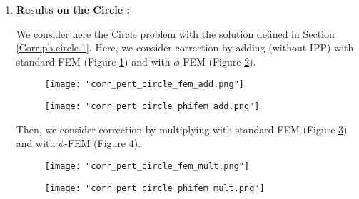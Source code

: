 \begin{enumerate}[label=\textbullet]
	\item \textbf{Results on the Circle :}
	
	We consider here the Circle problem with the solution defined in Section \ref{Corr.pb.circle.1}. Here, we consider correction by adding (without IPP) with standard FEM (Figure \ref{corr_pert_circle_fem_add}) and with $\phi$-FEM (Figure \ref{corr_pert_circle_phifem_add}).
	
	\begin{minipage}{0.48\linewidth}
		\begin{figure}[H]
			\centering
			\texttt{[image: "corr\_pert\_circle\_fem\_add.png"]}
			\label{corr_pert_circle_fem_add}
		\end{figure} 
	\end{minipage}
	\begin{minipage}{0.48\linewidth}
		\begin{figure}[H]
			\centering
			\texttt{[image: "corr\_pert\_circle\_phifem\_add.png"]}
			\label{corr_pert_circle_phifem_add}
		\end{figure} 
	\end{minipage}
	
	Then, we consider correction by multiplying with standard FEM (Figure \ref{corr_pert_circle_fem_mult}) and with $\phi$-FEM (Figure \ref{corr_pert_circle_phifem_mult}).
	
	\begin{minipage}{0.48\linewidth}
		\begin{figure}[H]
			\centering
			\texttt{[image: "corr\_pert\_circle\_fem\_mult.png"]}
			\label{corr_pert_circle_fem_mult}
		\end{figure} 
	\end{minipage}
	\begin{minipage}{0.48\linewidth}
		\begin{figure}[H]
			\centering
			\texttt{[image: "corr\_pert\_circle\_phifem\_mult.png"]}
			\label{corr_pert_circle_phifem_mult}
		\end{figure} 
	\end{minipage}
	

\end{enumerate}
